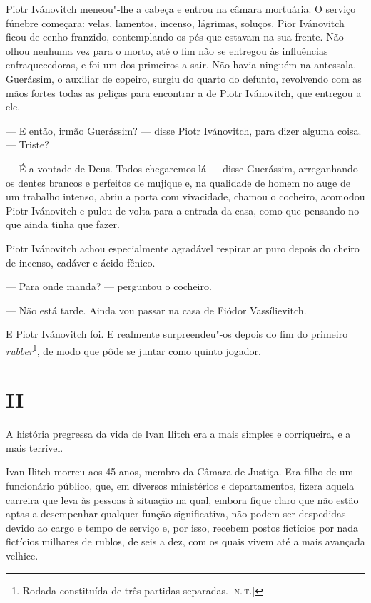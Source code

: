 Piotr Ivánovitch meneou"-lhe a cabeça e entrou na câmara mortuária. O
serviço fúnebre começara: velas, lamentos, incenso, lágrimas, soluços.
Pior Ivánovitch ficou de cenho franzido, contemplando os pés que estavam
na sua frente. Não olhou nenhuma vez para o morto, até o fim não se
entregou às influências enfraquecedoras, e foi um dos primeiros a sair.
Não havia ninguém na antessala. Guerássim, o auxiliar de copeiro, surgiu
do quarto do defunto, revolvendo com as mãos fortes todas as peliças
para encontrar a de Piotr Ivánovitch, que entregou a ele.

--- E então, irmão Guerássim? --- disse Piotr Ivánovitch, para dizer alguma
coisa. --- Triste?

--- É a vontade de Deus. Todos chegaremos lá --- disse Guerássim,
arreganhando os dentes brancos e perfeitos de mujique e, na qualidade de
homem no auge de um trabalho intenso, abriu a porta com vivacidade,
chamou o cocheiro, acomodou Piotr Ivánovitch e pulou de volta para a
entrada da casa, como que pensando no que ainda tinha que fazer.

Piotr Ivánovitch achou especialmente agradável respirar ar puro depois
do cheiro de incenso, cadáver e ácido fênico.

--- Para onde manda? --- perguntou o cocheiro.

--- Não está tarde. Ainda vou passar na casa de Fiódor Vassílievitch.

E Piotr Ivánovitch foi. E realmente surpreendeu"-os depois do fim do
primeiro \emph{rubber}\footnote{Rodada constituída de três partidas
  separadas. {[}\textsc{n.\,t.}{]}}, de modo que pôde se juntar como quinto
jogador.

\section{II}

A história pregressa da vida de Ivan Ilitch era a mais simples e
corriqueira, e a mais terrível.

Ivan Ilitch morreu aos 45 anos, membro da Câmara de Justiça. Era filho
de um funcionário público, que, em diversos ministérios e departamentos,
fizera aquela carreira que leva às pessoas à situação na qual, embora
fique claro que não estão aptas a desempenhar qualquer função
significativa, não podem ser despedidas devido ao cargo e tempo de
serviço e, por isso, recebem postos fictícios por nada fictícios
milhares de rublos, de seis a dez, com os quais vivem até a mais
avançada velhice.

